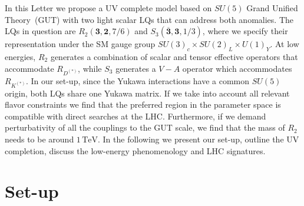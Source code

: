 \documentclass[aps,prd,superscriptaddress,twocolumn,secnumarabic]{revtex4-1}
\newcommand{\e}[1]{\,\mathrm{#1}}
\begin{document}
In this Letter we propose a UV complete model based on $SU(5)$ Grand Unified Theory~(GUT) with two light scalar LQs that can address both anomalies. The LQs in question are $R_2(\mathbf{3},\mathbf{2},7/6)$ and $S_3(\overline{\mathbf{3}},\mathbf{3},1/3)$, where we specify their representation under the SM gauge group $SU(3)_c \times SU(2)_L \times U(1)_Y$. At low energies, $R_2$ generates a combination of scalar and tensor effective operators that accommodate $R_{D^{(*)}}$, while $S_3$ generates a $V\!-\!A$ operator which accommodates $R_{K^{(*)}}$. In our set-up, since the Yukawa interactions have a common $SU(5)$ origin, both LQs share one Yukawa matrix. If we take into account all relevant flavor constraints we find that the preferred region in the parameter space is compatible with direct searches at the LHC. Furthermore, if we demand perturbativity of all the couplings to the GUT scale, we find that the mass of $R_2$ needs to be around $1\e{TeV}$. In the following we present our set-up, outline the UV completion, discuss the low-energy phenomenology and LHC signatures.

\section{Set-up}
\end{document}
